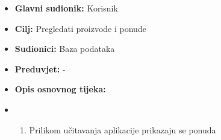                         \noindent {}
					\begin{itemize}
	
						\item \textbf{Glavni sudionik: }Korisnik
						\item  \textbf{Cilj:} Pregledati proizvode i ponude
						\item  \textbf{Sudionici:} Baza podataka
						\item  \textbf{Preduvjet:} -
						\item  \textbf{Opis osnovnog tijeka:}
						
						\item[] \begin{enumerate}
							\item Prilikom učitavanja aplikacije prikazaju se ponuda\\
						\end{enumerate}
						
					\end{itemize}


